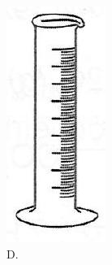 \documentclass[10pt]{article}
\begin{document}
\begin{figure}[h]
\begin{center}
\captionsetup{labelformat=empty}
\caption{D.}
  \includegraphics[width=\textwidth]{2025_10_23_de6f5713836e4e91b3c8g-014(1)}
\end{center}
\end{figure}
\end{document}
